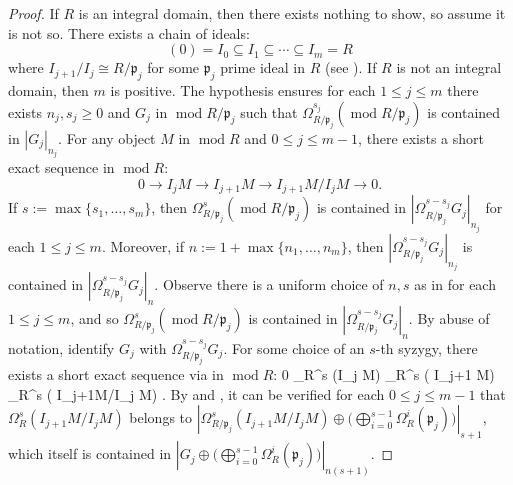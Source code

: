 \documentclass[11pt]{amsart}
\let\oldequation\equation
\let\oldendequation\endequation
\renewenvironment{equation}{\linenomathNonumbers\oldequation}{\oldendequation\endlinenomath}
\theoremstyle{plain}
\theoremstyle{definition}
\numberwithin{equation}{section}
\numberwithin{theorem}{section}
\begin{document}
\begin{proof}
    If $R$ is an integral domain, then there exists nothing to show, so assume it is not so. There exists a chain of ideals:
    \begin{displaymath}
        (0)=I_0 \subseteq I_1 \subseteq \cdots \subseteq I_m = R
    \end{displaymath}
    where $I_{j+1}/I_j \cong R/\mathfrak{p}_j$ for some $\mathfrak{p}_j$ prime ideal in $R$ (see \cite[Theorem 6.4]{Matsumura:1986}). If $R$ is not an integral domain, then $m$ is positive. The hypothesis ensures for each $1\leq j \leq m$ there exists $n_j, s_j\geq 0$ and $G_j $ in $ \operatorname{mod}R/\mathfrak{p}_j$ such that $\Omega^{s_j}_{R/\mathfrak{p}_j} (\operatorname{mod}R/\mathfrak{p}_j)$ is contained in $ |G_j|_{n_j}$. For any object $M$ in $ \operatorname{mod}R$ and $0 \leq j \leq m-1$, there exists a short exact sequence in $\operatorname{mod}R$:
    \begin{displaymath}
        0 \to I_j M \to I_{j+1} M \to I_{j+1}M/I_j M \to 0.
    \end{displaymath}
    If $s:=\max\{s_1,\ldots,s_m\}$, then $\Omega^s_{R/\mathfrak{p}_j} (\operatorname{mod}R/\mathfrak{p}_j)$ is contained in $|\Omega^{s-s_j}_{R/\mathfrak{p}_j} G_j|_{n_j}$ for each $1\leq j \leq m$. Moreover, if $n:=1+ \max\{ n_1,\ldots,n_m\}$, then $|\Omega^{s-s_j}_{R/\mathfrak{p}_j} G_j|_{n_j} $ is contained in $ |\Omega^{s-s_j}_{R/\mathfrak{p}_j} G_j|_n$. Observe there is a uniform choice of $n,s$ as in for each $1\leq j \leq m$, and so $\Omega^s_{R/\mathfrak{p}_j} (\operatorname{mod}R/\mathfrak{p}_j)$ is contained in $  |\Omega^{s-s_j}_{R/\mathfrak{p}_j} G_j|_n$. By abuse of notation, identify $G_j$ with $\Omega^{s-s_j}_{R/\mathfrak{p}_j} G_j$. For some choice of an $s$-th syzygy, there exists a short exact sequence via  in $\operatorname{mod}R$:
    \begin{equation}
        \label{eq:syzygy_ses_module}
        0 \to \Omega_R^s (I_j M) \to \Omega_R^s ( I_{j+1} M) \to \Omega_R^s ( I_{j+1}M/I_j M) .
    \end{equation}
    By  and , it can be verified for each $0\leq j \leq m-1$ that $\Omega^s_R (I_{j+1} M/I_j M)$ belongs to $|\Omega^s_{R/\mathfrak{p}_j}(I_{j+1} M/I_j M) \oplus \big( \bigoplus_{i=0}^{s-1} \Omega_R^i (\mathfrak{p}_j) \big)|_{s+1} $, which itself is contained in $|G_j \oplus \big( \bigoplus_{i=0}^{s-1} \Omega_R^i (\mathfrak{p}_j) \big)|_{n(s+1)}$. 
    

\end{proof}
\end{document}
